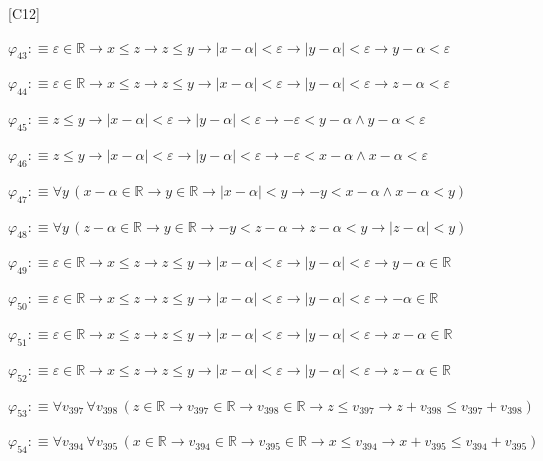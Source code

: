 \begin{fullproof}{[C12]}
\begin{abbrevlist}
\item $\varphi_{43} :\equiv \varepsilon \in \mathbb{R} \to x \leq z \to z \leq y \to \lvert x - \alpha \rvert < \varepsilon \to \lvert y - \alpha \rvert < \varepsilon \to y - \alpha < \varepsilon$
\item $\varphi_{44} :\equiv \varepsilon \in \mathbb{R} \to x \leq z \to z \leq y \to \lvert x - \alpha \rvert < \varepsilon \to \lvert y - \alpha \rvert < \varepsilon \to z - \alpha < \varepsilon$
\item $\varphi_{45} :\equiv z \leq y \to \lvert x - \alpha \rvert < \varepsilon \to \lvert y - \alpha \rvert < \varepsilon \to -\varepsilon < y - \alpha \land y - \alpha < \varepsilon$
\item $\varphi_{46} :\equiv z \leq y \to \lvert x - \alpha \rvert < \varepsilon \to \lvert y - \alpha \rvert < \varepsilon \to -\varepsilon < x - \alpha \land x - \alpha < \varepsilon$
\item $\varphi_{47} :\equiv \forall y\,(x - \alpha \in \mathbb{R} \to y \in \mathbb{R} \to \lvert x - \alpha \rvert < y \to -y < x - \alpha \land x - \alpha < y)$
\item $\varphi_{48} :\equiv \forall y\,(z - \alpha \in \mathbb{R} \to y \in \mathbb{R} \to -y < z - \alpha \to z - \alpha < y \to \lvert z - \alpha \rvert < y)$
\item $\varphi_{49} :\equiv \varepsilon \in \mathbb{R} \to x \leq z \to z \leq y \to \lvert x - \alpha \rvert < \varepsilon \to \lvert y - \alpha \rvert < \varepsilon \to y - \alpha \in \mathbb{R}$
\item $\varphi_{50} :\equiv \varepsilon \in \mathbb{R} \to x \leq z \to z \leq y \to \lvert x - \alpha \rvert < \varepsilon \to \lvert y - \alpha \rvert < \varepsilon \to -\alpha \in \mathbb{R}$
\item $\varphi_{51} :\equiv \varepsilon \in \mathbb{R} \to x \leq z \to z \leq y \to \lvert x - \alpha \rvert < \varepsilon \to \lvert y - \alpha \rvert < \varepsilon \to x - \alpha \in \mathbb{R}$
\item $\varphi_{52} :\equiv \varepsilon \in \mathbb{R} \to x \leq z \to z \leq y \to \lvert x - \alpha \rvert < \varepsilon \to \lvert y - \alpha \rvert < \varepsilon \to z - \alpha \in \mathbb{R}$
\item $\varphi_{53} :\equiv \forall v_{397}\,\forall v_{398}\,(z \in \mathbb{R} \to v_{397} \in \mathbb{R} \to v_{398} \in \mathbb{R} \to z \leq v_{397} \to z + v_{398} \leq v_{397} + v_{398})$
\item $\varphi_{54} :\equiv \forall v_{394}\,\forall v_{395}\,(x \in \mathbb{R} \to v_{394} \in \mathbb{R} \to v_{395} \in \mathbb{R} \to x \leq v_{394} \to x + v_{395} \leq v_{394} + v_{395})$

\end{abbrevlist}
\end{fullproof}

